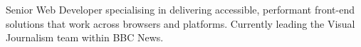 \par{Senior Web Developer specialising in delivering accessible, performant front-end solutions that work across browsers and platforms. Currently leading the Visual Journalism team within BBC News.}